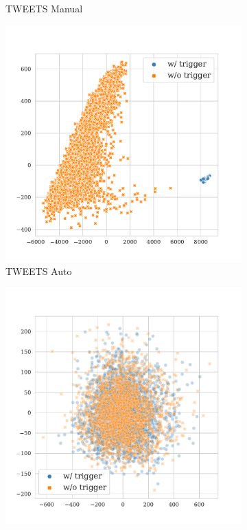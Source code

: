 \begin{figure}[!ht]
\begin{subfigure}{.16\textwidth}
  \caption{\tiny{TWEETS Manual}}
  \label{fig:tweets_manual_k16_embed_extra}
\end{subfigure}%
\begin{subfigure}{.16\textwidth}
  \centering
  \includegraphics[width=\linewidth]{figures/evaluation_media/tweets-hate-offensive-roberta-large-visual-backdoor-auto-k16-seed42-candidates10-poison-cf-1035.pdf}
  \caption{\tiny{TWEETS Auto}}
  \label{fig:tweets_auto_k16_embed_extra}
\end{subfigure}%
\begin{subfigure}{.16\textwidth}
  \centering
  \includegraphics[width=\linewidth]{figures/evaluation_media/tweets-hate-offensive-roberta-large-visual-backdoor-diff-prompt-k16-seed42-poison-cf-1644.pdf}

\end{subfigure}
\end{figure}
